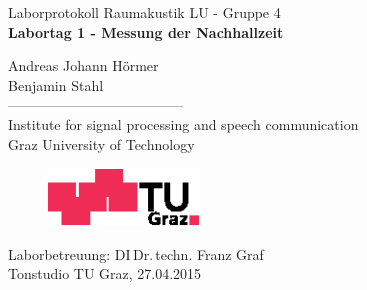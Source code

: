 \documentclass[11pt]{report}
\begin{document}
\begin{titlepage}
\begin{center}
  \vspace*{0.5cm}
  {\LARGE Laborprotokoll Raumakustik LU - Gruppe 4} \\
  \vspace{15mm}
  {\huge \bf Labortag 1 - Messung der Nachhallzeit \\}

  \vspace{15mm}
  {\LARGE Andreas Johann H\"ormer\\
Benjamin Stahl} \\

  \vspace{10mm}%
  -------------------------------------- \\
  \vspace{10mm}%
  \large
  Institute for signal processing and speech communication \\
  Graz University of Technology \\


  \vspace{15mm}%
  \begin{figure}[!ht]
  \begin{center}
  \centerline{\includegraphics[width=4cm,keepaspectratio=true]{TULogoneu}}
  \end{center}
  \end{figure}
  \vspace{10mm}
Laborbetreuung: DI\,Dr.\,techn. Franz Graf \\
  \vfill
  Tonstudio TU Graz, 27.04.2015
  \vspace{0.5cm}
\end{center}
\end{titlepage}

\end{document}
